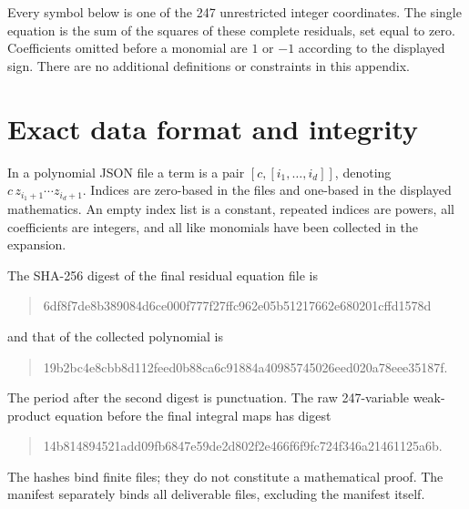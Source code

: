 \documentclass[11pt,letterpaper]{article}
\begin{document}
Every symbol below is one of the 247 unrestricted integer coordinates.
The single equation is the sum of the squares of these complete
residuals, set equal to zero. Coefficients omitted before a monomial
are $1$ or $-1$ according to the displayed sign. There are no
additional definitions or constraints in this appendix.

\begingroup
\small
\setlength{\abovedisplayskip}{5pt}
\setlength{\belowdisplayskip}{5pt}
\setlength{\abovedisplayshortskip}{3pt}
\setlength{\belowdisplayshortskip}{3pt}

\endgroup

\clearpage
\section{Exact data format and integrity}

In a polynomial JSON file a term is a pair
$[c,[i_1,\ldots,i_d]]$, denoting
$c\,z_{i_1+1}\cdots z_{i_d+1}$. Indices are zero-based in the files
and one-based in the displayed mathematics. An empty index list is
a constant, repeated indices are powers, all coefficients are integers,
and all like monomials have been collected in the expansion.

The SHA-256 digest of the final residual equation file is
\begin{quote}\small\ttfamily
6df8f7de8b389084d6ce000f777f27ffc962e05b51217662e680201cffd1578d
\end{quote}
and that of the collected polynomial is
\begin{quote}\small\ttfamily
19b2bc4e8cbb8d112feed0b88ca6c91884a40985745026eed020a78eee35187f.
\end{quote}
The period after the second digest is punctuation. The raw
247-variable weak-product equation before the final integral maps has
digest
\begin{quote}\small\ttfamily
14b814894521add09fb6847e59de2d802f2e466f6f9fc724f346a21461125a6b.
\end{quote}
The hashes bind finite files; they do not constitute a mathematical
proof. The manifest separately binds all deliverable files, excluding
the manifest itself.
\end{document}
